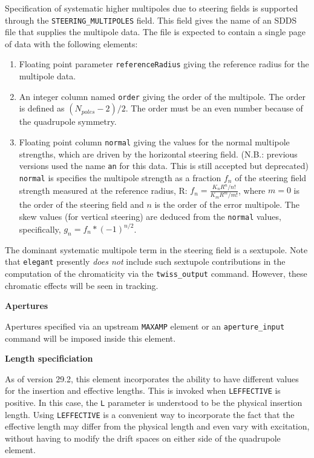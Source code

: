 Specification of systematic higher multipoles due to steering fields is
supported through the \verb|STEERING_MULTIPOLES| field.  This field gives the
name of an SDDS file that supplies the multipole data.  The file is
expected to contain a single page of data with the following elements:
\begin{enumerate}
\item Floating point parameter {\tt referenceRadius} giving the reference
 radius for the multipole data.
\item An integer column named {\tt order} giving the order of the multipole.
The order is defined as $(N_{poles}-2)/2$.  The order must be an even number
because of the quadrupole symmetry.
\item Floating point column {\tt normal} giving the values for the normal
multipole strengths, which are driven by the horizontal steering field.
(N.B.: previous versions used the name {\tt an} for this data. This is still accepted but deprecated)
{\tt normal} is specifies the multipole strength as a fraction $f_n$ of the steering field strength measured at the reference radius, R: 
$f_n = \frac{K_n R^n / n!}{K_m R^m / m!}$, where 
$m=0$ is the order of the steering field and $n$ is the order of the error multipole.
The skew values (for vertical steering) are deduced from the {\tt normal} values, specifically,
$g_n = f_n*(-1)^{n/2}$.
\end{enumerate}

The dominant systematic multipole term in the steering field is a
sextupole.  Note that {\tt elegant} presently {\em does not} include
such sextupole contributions in the computation of the chromaticity
via the {\tt twiss\_output} command.  However, these chromatic effects
will be seen in tracking.

{\bf Apertures}

Apertures specified via an upstream \verb|MAXAMP| element or an \verb|aperture_input|
command will be imposed inside this element.

{\bf Length specificiation}

As of version 29.2, this element incorporates the ability to have different values for the insertion
and effective lengths. This is invoked when \verb|LEFFECTIVE| is positive. In this case, the
\verb|L| parameter is understood to be the physical insertion length. Using \verb|LEFFECTIVE| is
a convenient way to incorporate the fact that the effective length may differ from the physical
length and even vary with excitation, without having to modify the drift spaces on either side of
the quadrupole element.

